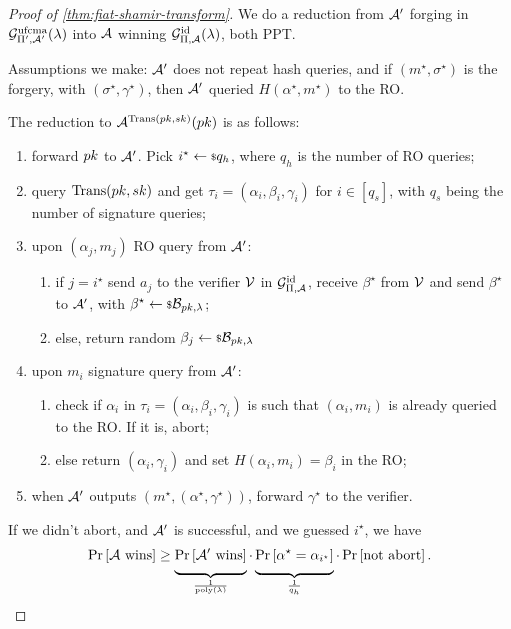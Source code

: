 \begin{proof}[Proof of \cref{thm:fiat-shamir-transform}]
	We do a reduction from $\mathcal{A}'$ forging in $\mathcal{G}^{\mathrm{ufcma}}_{\Pi', \mathcal{A}'}(\lambda)$ into $\mathcal{A}$ winning $\mathcal{G}^{\mathrm{id}}_{\Pi, \mathcal{A}}(\lambda)$, both \ac{PPT}.

	Assumptions we make: $\mathcal{A}'$ does not repeat hash queries, and if $(m^{\star}, \sigma^{\star})$ is the forgery, with $(\sigma^{\star}, \gamma^{\star})$, then $\mathcal{A}'$ queried $H(\alpha^{\star}, m^{\star})$ to the \ac{RO}.

	The reduction to $\mathcal{A}^{\mathrm{Trans}(pk, sk)}(pk)$ is as follows:
	\begin{enumerate}
		\item forward $pk$ to $\mathcal{A}'$.
			Pick $i^{\star} \leftarrow {\scriptstyle \$} {q_h}$, where $q_h$ is the number of \ac{RO} queries;
		\item query $\mathrm{Trans}(pk, sk)$ and get $\tau_i = (\alpha_i, \beta_i, \gamma_i)$ for $i \in [q_s]$, with $q_s$ being the number of signature queries;
		\item upon $(\alpha_j, m_j)$ \ac{RO} query from $\mathcal{A}'$:
			\begin{enumerate}
				\item if $j = i^{\star}$ send $a_j$ to the verifier $\mathcal{V}$ in $\mathcal{G}^{\mathrm{id}}_{\Pi, \mathcal{A}}$, receive $\beta^{\star}$ from $\mathcal{V}$ and send $\beta^{\star}$ to $\mathcal{A}'$, with $\beta^{\star} \leftarrow {\scriptstyle \$} {\mathcal{B}_{pk, \lambda}}$;
				\item else, return random $\beta_j \leftarrow {\scriptstyle \$} {\mathcal{B}_{pk, \lambda}}$
			\end{enumerate}
		\item upon $m_i$ signature query from $\mathcal{A}'$:
			\begin{enumerate}
				\item check if $\alpha_i$ in $\tau_i = (\alpha_i, \beta_i, \gamma_i)$ is such that $(\alpha_i, m_i)$ is already queried to the \ac{RO}.
					If it is, abort;
				\item else return $(\alpha_i, \gamma_i)$ and set $H(\alpha_i, m_i) = \beta_i$ in the \ac{RO};
			\end{enumerate}
		\item when $\mathcal{A}'$ outputs $(m^{\star}, (\alpha^{\star}, \gamma^{\star}))$, forward $\gamma^{\star}$ to the verifier.
	\end{enumerate}

	If we didn't abort, and $\mathcal{A}'$ is successful, and we guessed $i^{\star}$, we have
	\begin{equation*}
		\mathop{\mathrm{Pr}}\limits_{} \left[ {\text{$\mathcal{A}$ wins}} \right] \ge
		\underbrace{\mathop{\mathrm{Pr}}\limits_{} \left[ {\text{$\mathcal{A}'$ wins}} \right]}_{\frac{1}{\mathrm{poly}(\lambda)}} \cdot
		\underbrace{\mathop{\mathrm{Pr}}\limits_{} \left[ {\alpha^{\star} = \alpha_{i^{\star}}} \right]}_{\frac{1}{q_h}} \cdot
		\mathop{\mathrm{Pr}}\limits_{} \left[ {\text{not abort}} \right].
	\end{equation*}


\end{proof}

